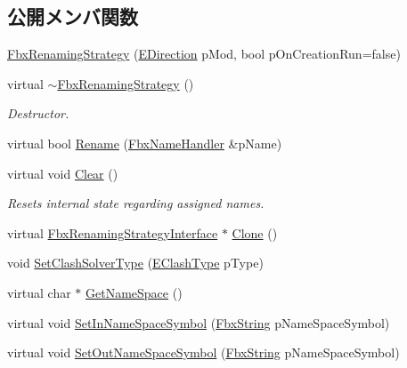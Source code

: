 \subsection*{公開メンバ関数}
\begin{DoxyCompactItemize}
\item 
\hyperlink{class_fbx_renaming_strategy_a9412da6dd0bb77ed4597b114173d5385}{Fbx\+Renaming\+Strategy} (\hyperlink{class_fbx_renaming_strategy_a68099d97d087f66edd2ea873e0dbf423}{E\+Direction} p\+Mod, bool p\+On\+Creation\+Run=false)
\item 
virtual \hyperlink{class_fbx_renaming_strategy_a3d041932b649c5b69b29d156574bece1}{$\sim$\+Fbx\+Renaming\+Strategy} ()
\begin{DoxyCompactList}\small\item\em Destructor. \end{DoxyCompactList}\item 
virtual bool \hyperlink{class_fbx_renaming_strategy_af21a13396dd6726e87b123f398ac79f2}{Rename} (\hyperlink{class_fbx_name_handler}{Fbx\+Name\+Handler} \&p\+Name)
\item 
virtual void \hyperlink{class_fbx_renaming_strategy_a87b1e89413d7b8c86a9d8a9f6fa6490f}{Clear} ()
\begin{DoxyCompactList}\small\item\em Resets internal state regarding assigned names. \end{DoxyCompactList}\item 
virtual \hyperlink{class_fbx_renaming_strategy_interface}{Fbx\+Renaming\+Strategy\+Interface} $\ast$ \hyperlink{class_fbx_renaming_strategy_a36d1f3cc01ea460ab97d95fc8d8dd136}{Clone} ()
\item 
void \hyperlink{class_fbx_renaming_strategy_a71f4af04239a7d159f4f049080616356}{Set\+Clash\+Solver\+Type} (\hyperlink{class_fbx_renaming_strategy_aacebe214cec13a6cdbbc9e40d16c57dd}{E\+Clash\+Type} p\+Type)
\item 
virtual char $\ast$ \hyperlink{class_fbx_renaming_strategy_a52dcb44dfa0ee8e965aa81b0b233611a}{Get\+Name\+Space} ()
\item 
virtual void \hyperlink{class_fbx_renaming_strategy_a7326723f421c3f81a2a2bbaa95f979fe}{Set\+In\+Name\+Space\+Symbol} (\hyperlink{class_fbx_string}{Fbx\+String} p\+Name\+Space\+Symbol)
\item 
virtual void \hyperlink{class_fbx_renaming_strategy_a83507388cab84a8905861a8331d57092}{Set\+Out\+Name\+Space\+Symbol} (\hyperlink{class_fbx_string}{Fbx\+String} p\+Name\+Space\+Symbol)
\item 

\end{DoxyCompactItemize}
